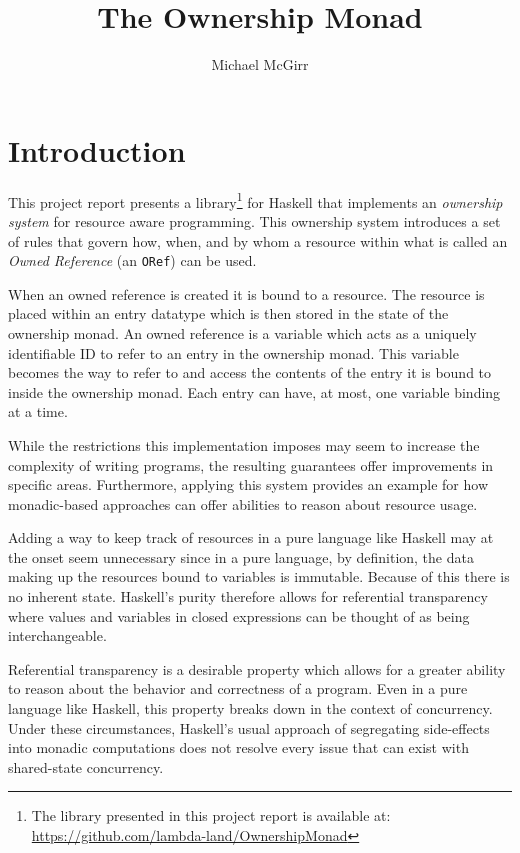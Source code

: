 \documentclass[onehalf,11pt]{beavtex}
\title{The Ownership Monad}
\author{Michael McGirr}
\begin{document}
\maketitle

\mainmatter

\chapter{Introduction}

This project report presents a
library\footnote{
  The library presented in this project report is available at:
  \href{https://github.com/lambda-land/OwnershipMonad}{https://github.com/lambda-land/OwnershipMonad}
}
for Haskell that implements an
\textit{ownership system} for resource aware programming. This ownership system
introduces a set of rules that govern how, when, and by whom a resource within
what is called an \textit{Owned Reference} (an \texttt{ORef}) can be used.

When an owned reference is created it is bound to a resource.
The resource is placed within an entry datatype which is then stored in the
state of the ownership monad.
An owned reference is a variable which acts as a uniquely identifiable ID to
refer to an entry in the ownership monad.
This variable becomes the way to refer to and access the contents of the
entry it is bound to inside the ownership monad.
Each entry can have, at most, one variable binding at a time.

While the restrictions this implementation imposes may seem to increase the
complexity of writing programs, the resulting guarantees offer improvements in
specific areas.
Furthermore, applying this system provides an example for how monadic-based
approaches can offer abilities to reason about resource usage.

Adding a way to keep track of resources in a pure language like Haskell may
at the onset seem unnecessary since in a pure language, by definition,
the data making up the resources bound to variables is immutable.
Because of this there is no inherent state.  Haskell's purity therefore allows
for referential transparency where values and variables in closed expressions
can be thought of as being interchangeable.

Referential transparency is a desirable property which allows for a greater
ability to reason about the behavior and correctness of a program.
Even in a pure language like Haskell, this property breaks down in the context
of concurrency.
Under these circumstances, Haskell's usual approach of segregating side-effects
into monadic computations does not resolve every issue that can exist with
shared-state concurrency.
\end{document}

